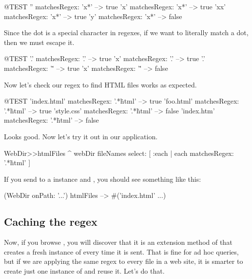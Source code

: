 \documentclass[a4paper,10pt,twoside]{book}
\begin{document}
\begin{code}{@TEST}
'' matchesRegex: 'x*'     --> true
'x' matchesRegex: 'x*'   --> true
'xx' matchesRegex: 'x*' --> true
'y' matchesRegex: 'x*'   --> false
\end{code}

Since the dot is a special character in regexes, if we want to literally match a dot, then we must escape it.

\begin{code}{@TEST}
'.' matchesRegex: '.'   --> true
'x' matchesRegex: '.'  --> true
'.' matchesRegex: '\.'  --> true
'x' matchesRegex: '\.' --> false
\end{code}

Now let's check our regex to find HTML files works as expected.

\begin{code}{@TEST}
'index.html' matchesRegex: '.*\.html' --> true
'foo.html' matchesRegex: '.*\.html'    --> true
'style.css' matchesRegex: '.*\.html'   --> false
'index.htm' matchesRegex: '.*\.html' --> false
\end{code}

Looks good. Now let's try it out in our application.


\begin{code}{}
WebDir>>htmlFiles
	^ webDir fileNames select: [ :each | each matchesRegex: '.*\.html' ]
\end{code}

If you send  to a  instance and , you should see something like this:

\begin{code}{}
(WebDir onPath: '...') htmlFiles --> #('index.html' ...)
\end{code}

\subsection{Caching the regex}

Now, if you browse , you will discover that it is an extension method of  that creates a fresh instance of  every time it is sent.  That is fine for ad hoc queries, but if we are applying the same regex to every file in a web site, it is smarter to create just one instance of  and reuse it. Let's do that.
\end{document}
